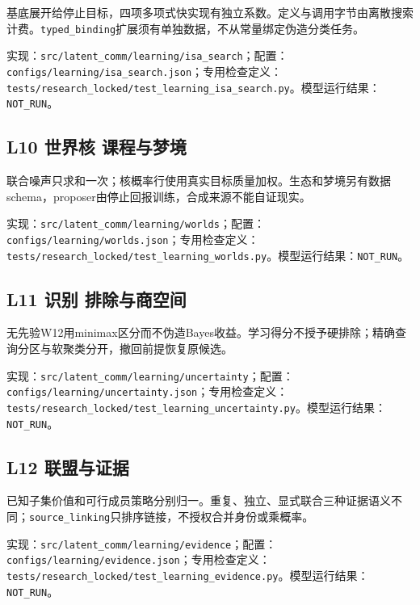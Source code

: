 \documentclass[
  10pt,
]{article}
\begin{document}
基底展开给停止目标，四项多项式快实现有独立系数。定义与调用字节由离散搜索计费。\nolinkurl{typed_binding}扩展须有单独数据，不从常量绑定伪造分类任务。

实现：{\small\nolinkurl{src/latent_comm/learning/isa_search}}；配置：{\small\nolinkurl{configs/learning/isa_search.json}}；专用检查定义：{\small\nolinkurl{tests/research_locked/test_learning_isa_search.py}}。模型运行结果：\nolinkurl{NOT_RUN}。

\subsection{L10 世界核
课程与梦境}\label{l10-ux4e16ux754cux6838-ux8bfeux7a0bux4e0eux68a6ux5883}

联合噪声只求和一次；核概率行使用真实目标质量加权。生态和梦境另有数据schema，proposer由停止回报训练，合成来源不能自证现实。

实现：{\small\nolinkurl{src/latent_comm/learning/worlds}}；配置：{\small\nolinkurl{configs/learning/worlds.json}}；专用检查定义：{\small\nolinkurl{tests/research_locked/test_learning_worlds.py}}。模型运行结果：\nolinkurl{NOT_RUN}。

\subsection{L11 识别
排除与商空间}\label{l11-ux8bc6ux522b-ux6392ux9664ux4e0eux5546ux7a7aux95f4}

无先验W12用minimax区分而不伪造Bayes收益。学习得分不授予硬排除；精确查询分区与软聚类分开，撤回前提恢复原候选。

实现：{\small\nolinkurl{src/latent_comm/learning/uncertainty}}；配置：{\small\nolinkurl{configs/learning/uncertainty.json}}；专用检查定义：{\small\nolinkurl{tests/research_locked/test_learning_uncertainty.py}}。模型运行结果：\nolinkurl{NOT_RUN}。

\subsection{L12 联盟与证据}\label{l12-ux8054ux76dfux4e0eux8bc1ux636e}

已知子集价值和可行成员策略分别归一。重复、独立、显式联合三种证据语义不同；\nolinkurl{source_linking}只排序链接，不授权合并身份或乘概率。

实现：{\small\nolinkurl{src/latent_comm/learning/evidence}}；配置：{\small\nolinkurl{configs/learning/evidence.json}}；专用检查定义：{\small\nolinkurl{tests/research_locked/test_learning_evidence.py}}。模型运行结果：\nolinkurl{NOT_RUN}。
\end{document}
